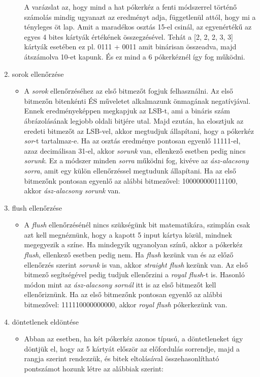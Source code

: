 \documentclass[]{thesis-ekf}
\theoremstyle{definition}
\theoremstyle{remark}
\begin{document}
\begin{enumerate}
\begin{itemize}
		A varázslat az, hogy mind a hat pókerkéz a fenti módszerrel történő számolás mindig ugyanazt az eredményt adja, függetlenül attól, hogy mi a tényleges öt lap. Amit a maradékos osztás 15-el csinál, az egyenértékű az egyes 4 bites kártyák értékének összegzésével. Tehát a [2, 2, 2, 3, 3] kártyák esetében ez pl. 0111 + 0011 amit binárisan összeadva, majd átszámolva 10-et kapunk. És ez mind a 6 pókerkéznél így fog működni.
	\end{itemize}
	\item sorok ellenőrzése
	\begin{itemize}
		\item A \emph{sorok} ellenőrzéséhez az első bitmezőt fogjuk felhasználni. Az első bitmezőn bitenkénti ÉS műveletet alkalmazunk önmagának negatívjával. Ennek eredményeképpen megkapjuk az LSB-t, ami a bináris szám ábrázolásának legjobb oldali bitjére utal. Majd ezután, ha elosztjuk az eredeti bitmezőt az LSB-vel, akkor megtudjuk állapítani, hogy a pókerkéz \emph{sor}-t tartalmaz-e. Ha az osztás eredménye pontosan egyenlő 11111-el, azaz decimálisan 31-el, akkor \emph{sorunk} van, ellenkező esetben pedig nincs \emph{sorunk}. Ez a módszer minden \emph{sorra} működni fog, kivéve az \emph{ász-alacsony sorra}, amit egy külön ellenőrzéssel megtudunk állapítani. Ha az első bitmezőnk pontosan egyenlő az alábbi bitmezővel: 100000000111100, akkor \emph{ász-alacsony sorunk} van.
	\end{itemize}
	\item flush ellenőrzése
	\begin{itemize}
		\item A \emph{flush} ellenőrzésénél nincs szükségünk bit matematikára, szimplán csak azt kell megnéznünk, hogy a kapott 5 input kártya közül, mindnek megegyezik a színe. Ha mindegyik ugyanolyan színű, akkor a pókerkéz \emph{flush}, ellenkező esetben pedig nem. Ha \emph{flush} kezünk van és az előző ellenőrzés szerint \emph{sorunk} is van, akkor \emph{straight flush} kezünk van. Az első bitmező segítségével pedig tudjuk ellenőrzini a \emph{royal flush}-t is. Hasonló módon mint az \emph{ász-alacsony sornál} itt is az első bitmezőt kell ellenőriznünk. Ha az első bitmezőnk pontosan egyenlő az alábbi bitmezővel: 111110000000000, akkor \emph{royal flush} pókerkezünk van.
	\end{itemize}
	\item döntetlenek eldöntése
	\begin{itemize}
		\item Abban az esetben, ha két pókerkéz azonos típusú, a döntetleneket úgy döntjük el, hogy az 5 kártyát először az előfordulás sorrendje, majd a rangja szerint rendezzük, és bitek eltolásával összehasonlítható pontszámot hozunk létre az alábbiak szerint:

\end{itemize}
\end{enumerate}
\end{document}
